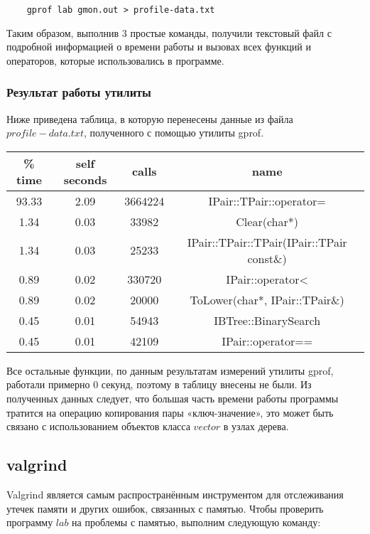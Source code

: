 \documentclass[12pt]{article}
\begin{document}
\begin{lstlisting}
    gprof lab gmon.out > profile-data.txt
\end{lstlisting}

Таким образом, выполнив 3 простые команды, получили текстовый файл с подробной 
информацией о времени работы и вызовах всех функций и операторов, которые 
использовались в программе.

\subsubsection*{Результат работы утилиты}

Ниже приведена таблица, в которую перенесены данные из файла $profile-data.txt$,
полученного с помощью утилиты gprof.

\begin{tabular}{ | c | c | c | c | }
    \hline
        \% time & self seconds & calls & name \\ \hline
        93.33 & 2.09 & 3664224 & IPair::TPair::operator= \\
        1.34 & 0.03 & 33982 & Clear(char*) \\
        1.34 & 0.03 & 25233 & IPair::TPair::TPair(IPair::TPair const\&) \\
        0.89 & 0.02 & 330720 & IPair::operator< \\
        0.89 & 0.02 & 20000 & ToLower(char*, IPair::TPair\&) \\
        0.45 & 0.01 & 54943 & IBTree::BinarySearch \\
        0.45 & 0.01 & 42109 & IPair::operator== \\
    \hline
\end{tabular}

Все остальные функции, по данным результатам измерений утилиты gprof, 
работали примерно 0 секунд, поэтому в таблицу внесены не были. Из полученных 
данных следует, что большая часть времени работы программы тратится на операцию 
копирования пары «ключ-значение», это может быть связано с использованием 
объектов класса $vector$ в узлах дерева.

\subsection*{valgrind}

Valgrind является самым распространённым инструментом для отслеживания утечек 
памяти и других ошибок, связанных с памятью. Чтобы проверить программу $lab$ 
на проблемы с памятью, выполним следующую команду:
\end{document}
